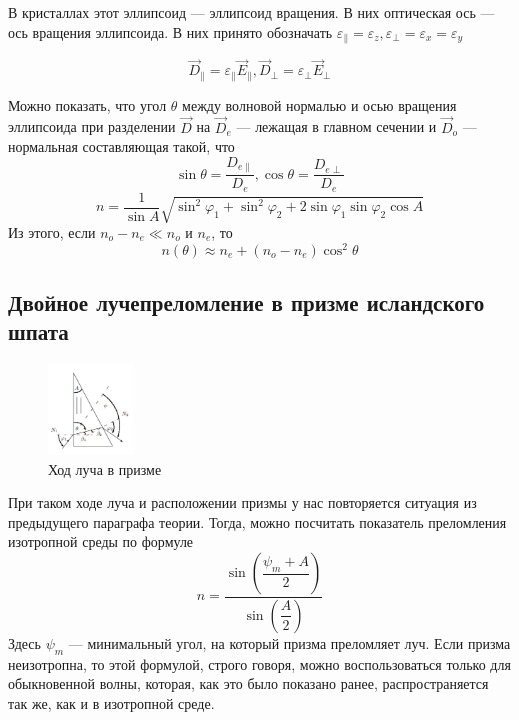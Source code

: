 В кристаллах этот эллипсоид --- эллипсоид вращения. В них оптическая ось --- ось вращения эллипсоида. В них принято обозначать $\varepsilon_{\parallel} = \varepsilon_z, \varepsilon_{\perp} = \varepsilon_x = \varepsilon_y$

\begin{equation}
\vec{D}_{\parallel} = \varepsilon_{\parallel} \vec{E}_{\parallel},\vec{D}_{\perp} = \varepsilon_{\perp} \vec{E}_{\perp} 
\end{equation}

Можно показать, что угол $\theta$ между волновой нормалью и осью вращения эллипсоида при разделении $\vec{D}$ на $\vec{D}_e$ --- лежащая в главном сечении и $\vec{D}_o$ --- нормальная составляющая такой, что
\begin{equation}
\sin \theta = \dfrac{D_{e\parallel}}{D_e}, \cos \theta = \dfrac{D_{e\perp}}{D_e}
\end{equation}
\begin{equation}
n = \dfrac{1}{\sin A}\sqrt{\sin^2 \varphi_1 + \sin^2 \varphi_2 + 2 \sin \varphi_1 \sin \varphi_2 \cos A}
\end{equation}
Из этого, если $n_o - n_e \ll n_o$ и $n_e$, то 
\begin{equation}
n(\theta) \approx n_e + (n_o - n_e) \cos^2 \theta
\end{equation}
\subsection*{Двойное лучепреломление в призме исландского шпата}
\begin{figure}
  \begin{center}
    \includegraphics[width = 0.2\textwidth]{1.png}
  \end{center}
  \caption{Ход луча в призме}
\end{figure}
При таком ходе луча и расположении призмы у нас повторяется ситуация из предыдущего параграфа теории. Тогда, можно посчитать показатель преломления изотропной среды по формуле 
\begin{equation}
n = \dfrac{\sin\left(\dfrac{\psi_m + A}{2}\right)}{\sin \left(\dfrac{A}{2}\right)}
\end{equation}
Здесь $\psi_m$  --- минимальный угол, на который призма преломляет луч.
Если призма неизотропна, то этой формулой, строго говоря, можно воспользоваться только для обыкновенной волны, которая, как это было показано ранее, распространяется так же, как и в изотропной среде. 
